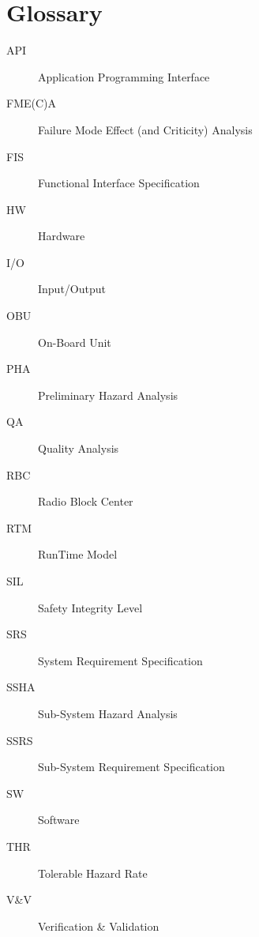 
\section{Glossary}
\begin{description}
\item[API] Application Programming Interface
\item[FME(C)A] Failure Mode Effect (and Criticity) Analysis
\item[FIS] Functional Interface Specification
\item[HW] Hardware
\item[I/O] Input/Output
\item[OBU] On-Board Unit
\item[PHA] Preliminary Hazard Analysis
\item[QA] Quality Analysis
\item[RBC] Radio Block Center
\item[RTM] RunTime Model
\item[SIL] Safety Integrity Level
\item[SRS] System Requirement Specification
\item[SSHA] Sub-System Hazard Analysis
\item[SSRS] Sub-System Requirement Specification
\item[SW] Software
\item[THR] Tolerable Hazard Rate
\item[V\&V] Verification \& Validation
\end{description}

